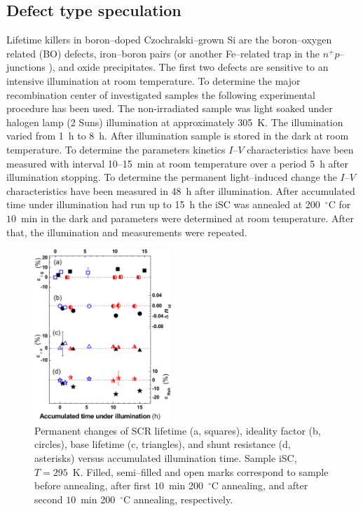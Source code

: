 \documentclass[aip,jap, amsmath,amssymb,reprint]{revtex4-1}
\begin{document}
\subsection{Defect type speculation\label{DefectType}}

Lifetime killers  in boron--doped Czochralski--grown Si are the  boron--oxygen related (BO) defects,\cite{LIDRev,LIDRev2}
iron--boron pairs \cite{MurphyJAP2011,FeB:Vahanissi,FeB:Schmidt} (or another Fe--related trap in the $n^+p$--junctions \cite{TeimurazPSS,TeimurazJAP}),
and oxide precipitates.\cite{MurphySC2014,Oxide_Schon,MurphyJAP2011,MurphyJAP2012,Oxide:Chen,Oxide:Porrini}
The first two defects are sensitive to an intensive illumination at room temperature.
To determine the major recombination center of investigated samples the following experimental procedure has been used.
The non-irradiated sample was light soaked under halogen lamp (2 Suns) illumination at approximately 305~K.
The illumination varied from 1~h to 8~h.
After illumination sample is stored in the dark at room temperature.
To determine the parameters kinetics $I$--$V$ characteristics have been measured with interval 10--15~min at room temperature over a period 5~h after illumination stopping.
To determine the permanent light--induced change the $I$--$V$ characteristics have been measured in 48~h after illumination.
After accumulated time under illumination had run up to 15~h the iSC was annealed at 200~$^\circ$C for $10$~min in the dark and parameters were determined at room temperature.
After that, the illumination and measurements were repeated.


\begin{figure}
\includegraphics[width=0.46\textwidth]{olikhFigIllumin}%
\caption{\label{fig_Illum}
Permanent changes of SCR lifetime (a, squares), ideality factor (b, circles), base lifetime (c, triangles), and shunt resistance (d, asterisks) versus accumulated illumination time.
Sample iSC, $T=295$~K.
Filled, semi--filled and open marks correspond to sample before annealing, after first $10$~min 200~$^\circ$C annealing, and after second $10$~min 200~$^\circ$C annealing, respectively.
}%
\end{figure}
\end{document}
